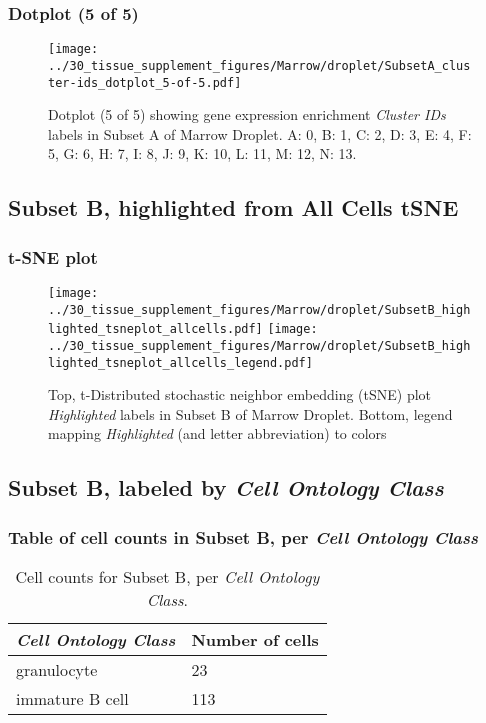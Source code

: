 \clearpage

\subsubsection{Dotplot (5 of 5)}
\begin{figure}[h]
\centering
\texttt{[image: ../30\_tissue\_supplement\_figures/Marrow/droplet/SubsetA\_cluster-ids\_dotplot\_5-of-5.pdf]}

\caption{ Dotplot (5 of 5)  showing gene expression enrichment \emph{Cluster IDs} labels in Subset A of Marrow Droplet. A: 0, B: 1, C: 2, D: 3, E: 4, F: 5, G: 6, H: 7, I: 8, J: 9, K: 10, L: 11, M: 12, N: 13.}
\end{figure}


\clearpage
\subsection{Subset B, highlighted from All Cells tSNE}
\subsubsection{t-SNE plot}
\begin{figure}[h]
\centering
\texttt{[image: ../30\_tissue\_supplement\_figures/Marrow/droplet/SubsetB\_highlighted\_tsneplot\_allcells.pdf]}
\texttt{[image: ../30\_tissue\_supplement\_figures/Marrow/droplet/SubsetB\_highlighted\_tsneplot\_allcells\_legend.pdf]}
\caption{Top, t-Distributed stochastic neighbor embedding (tSNE) plot  \emph{Highlighted} labels in Subset B of Marrow Droplet. Bottom, legend mapping \emph{Highlighted} (and letter abbreviation) to colors}
\end{figure}


\clearpage

\subsection{Subset B, labeled by \emph{Cell Ontology Class}}
\subsubsection{Table of cell counts in Subset B, per \emph{Cell Ontology Class}}\begin{table}[h]
\centering
\label{my-label}
\begin{tabular}{@{}ll@{}}
\toprule

\emph{Cell Ontology Class}& Number of cells \\ \midrule
granulocyte & 23 \\

immature B cell & 113 \\
\bottomrule
\end{tabular}
\caption{Cell counts for Subset B, per \emph{Cell Ontology Class}.}
\end{table}

